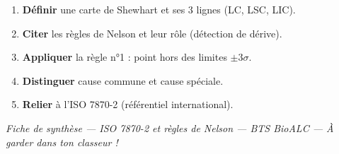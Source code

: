 \documentclass[11pt,a4paper]{article}
\begin{document}
\begin{retenir}[title={\faGraduationCap\quad Ce que tu dois savoir}]
\begin{enumerate}[leftmargin=1.2cm, itemsep=2pt]
    \item \textbf{Définir} une carte de Shewhart et ses 3 lignes (LC, LSC, LIC).
    \item \textbf{Citer} les règles de Nelson et leur rôle (détection de dérive).
    \item \textbf{Appliquer} la règle n°1 : point hors des limites \(\pm 3\sigma\).
    \item \textbf{Distinguer} cause commune et cause spéciale.
    \item \textbf{Relier} à l'ISO 7870-2 (référentiel international).
\end{enumerate}
\end{retenir}

\vspace{0.4cm}

\begin{center}
\textit{Fiche de synthèse — ISO 7870-2 et règles de Nelson — BTS BioALC — À garder dans ton classeur !}
\end{center}
\end{document}
